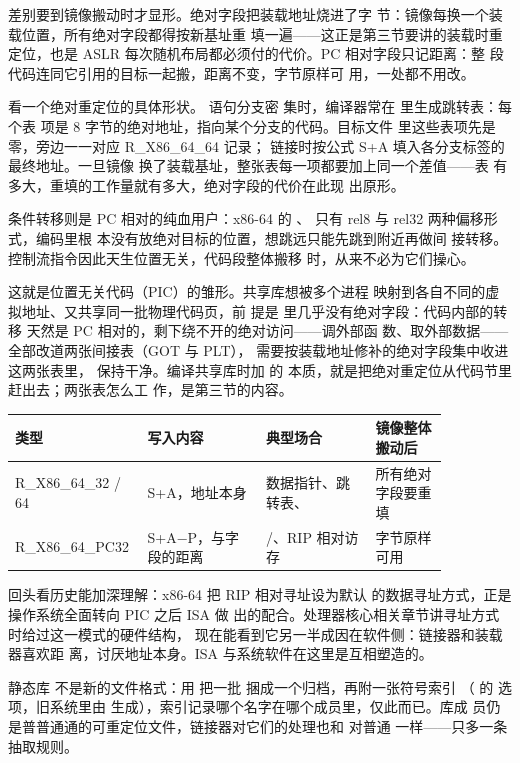 差别要到镜像搬动时才显形。绝对字段把装载地址烧进了字
节：镜像每换一个装载位置，所有绝对字段都得按新基址重
填一遍——这正是第三节要讲的装载时重定位，也是 ASLR
每次随机布局都必须付的代价。PC 相对字段只记距离：整
段代码连同它引用的目标一起搬，距离不变，字节原样可
用，一处都不用改。

看一个绝对重定位的具体形状。 语句分支密
集时，编译器常在  里生成跳转表：每个表
项是 8 字节的绝对地址，指向某个分支的代码。目标文件
里这些表项先是零，旁边一一对应 R\_X86\_64\_64 记录；
链接时按公式 S+A 填入各分支标签的最终地址。一旦镜像
换了装载基址，整张表每一项都要加上同一个差值——表
有多大，重填的工作量就有多大，绝对字段的代价在此现
出原形。

条件转移则是 PC 相对的纯血用户：x86-64 的 、
 只有 rel8 与 rel32 两种偏移形式，编码里根
本没有放绝对目标的位置，想跳远只能先跳到附近再做间
接转移。控制流指令因此天生位置无关，代码段整体搬移
时，从来不必为它们操心。

这就是位置无关代码（PIC）的雏形。共享库想被多个进程
映射到各自不同的虚拟地址、又共享同一批物理代码页，前
提是  里几乎没有绝对字段：代码内部的转移
天然是 PC 相对的，剩下绕不开的绝对访问——调外部函
数、取外部数据——全部改道两张间接表（GOT 与 PLT），
需要按装载地址修补的绝对字段集中收进这两张表里，
 保持干净。编译共享库时加  的
本质，就是把绝对重定位从代码节里赶出去；两张表怎么工
作，是第三节的内容。

\begin{longtable}{L{0.2\linewidth}L{0.26\linewidth}L{0.24\linewidth}L{0.16\linewidth}}
\toprule
类型 & 写入内容 & 典型场合 & 镜像整体搬动后 \\
\midrule
R\_X86\_64\_32 / 64 & S+A，地址本身 & 数据指针、跳转表、 & 所有绝对字段要重填 \\\tablerowrule
R\_X86\_64\_PC32 & S+A−P，与字段的距离 & /、RIP 相对访存 & 字节原样可用 \\
\bottomrule
\end{longtable}

回头看历史能加深理解：x86-64 把 RIP 相对寻址设为默认
的数据寻址方式，正是操作系统全面转向 PIC 之后 ISA 做
出的配合。处理器核心相关章节讲寻址方式时给过这一模式的硬件结构，
现在能看到它另一半成因在软件侧：链接器和装载器喜欢距
离，讨厌地址本身。ISA 与系统软件在这里是互相塑造的。

静态库  不是新的文件格式：用 
把一批  捆成一个归档，再附一张符号索引
（ 的  选项，旧系统里由 
生成），索引记录哪个名字在哪个成员里，仅此而已。库成
员仍是普普通通的可重定位文件，链接器对它们的处理也和
对普通  一样——只多一条抽取规则。

